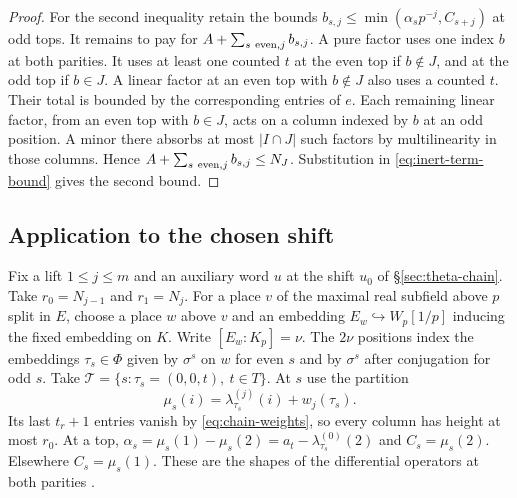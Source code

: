 \begin{proof}
For the second inequality retain the bounds
$b_{s,j}\le\min(\alpha_s p^{-j},C_{s+j})$ at odd tops. It remains to
pay for $A+\sum_{s\ {\rm even},j}b_{s,j}$. A pure factor uses one
index $b$ at both parities. It uses at least one counted $t$ at the
even top if $b\notin J$, and at the odd top if $b\in J$.
A linear factor at an even top with $b\notin J$ also uses a counted
$t$. Their total is bounded by the corresponding entries of $e$.
Each remaining linear factor, from an even top with $b\in J$, acts on
a column indexed by $b$ at an odd position. A minor there absorbs at
most $|I\cap J|$ such factors by multilinearity in those columns.
Hence $A+\sum_{s\ {\rm even},j}b_{s,j}\le N_J$.
Substitution in \eqref{eq:inert-term-bound} gives the second bound.
\end{proof}

\subsection{Application to the chosen shift}

Fix a lift $1\le j\le m$ and an auxiliary word $u$ at the shift $u_0$
of \S\ref{sec:theta-chain}. Take $r_0=N_{j-1}$ and $r_1=N_j$.
For a place $v$ of the maximal real subfield above $p$ split in $E$,
choose a place $w$ above $v$ and an embedding $E_w\hookrightarrow
W_p[1/p]$ inducing the fixed embedding on $K$. Write
$[E_w:K_p]=\nu$. The $2\nu$ positions index the embeddings
$\tau_s\in\Phi$ given by $\sigma^s$ on $w$ for even $s$ and by
$\sigma^s$ after conjugation for odd $s$.
Take $\mathcal T=\{s:\tau_s=(0,0,t),\ t\in T\}$.
At $s$ use the partition
\[
   \mu_s(i)=\lambda^{(j)}_{\tau_s}(i)+w_j(\tau_s).
\]
Its last $t_r+1$ entries vanish by \eqref{eq:chain-weights}, so
every column has height at most $r_0$. At a top,
$\alpha_s=\mu_s(1)-\mu_s(2)=a_t-\lambda^{(0)}_{\tau_s}(2)$
and $C_s=\mu_s(2)$. Elsewhere $C_s=\mu_s(1)$.
These are the shapes of the differential operators at both parities
\citep[Lemma~11.36]{adriazola-grh}.


